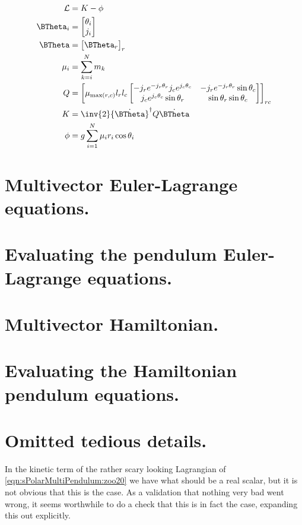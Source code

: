 \begin{align}\label{eqn:sPolarMultiPendulum:zoo20}
\LL &= K - \phi \\
\BTheta_i &=
\begin{bmatrix}
\theta_i \\
j_i
\end{bmatrix} \\
\BTheta &=
{\begin{bmatrix}
\BTheta_r
\end{bmatrix}}_{r} \\
\mu_i &=
\sum_{k=i}^N m_k \\
Q &=
{\begin{bmatrix}
\mu_{\max(r,c)}
l_r l_c
\begin{bmatrix}
- j_r e^{-j_r \theta_r} j_c e^{j_c\theta_c} & - j_r e^{-j_r \theta_r} \sin\theta_c \\
j_c e^{j_c \theta_c} \sin\theta_r & \sin\theta_r \sin\theta_c
\end{bmatrix}
\end{bmatrix}}_{rc} \\
K &=
\inv{2} {\dot{\BTheta}}^\dagger Q \dot{\BTheta} \\
\phi &=
g \sum_{i=1}^N \mu_i r_i \cos\theta_i
\end{align}

\section{Multivector Euler-Lagrange equations.}

\section{Evaluating the pendulum Euler-Lagrange equations.}

\section{Multivector Hamiltonian.}

\section{Evaluating the Hamiltonian pendulum equations.}

\section{Omitted tedious details.}

In the kinetic term of the rather scary looking Lagrangian of \ref{eqn:sPolarMultiPendulum:zoo20} we have what should be a real scalar, but it is not obvious that this is the case.  As a validation that nothing very bad went wrong, it seems worthwhile to do a check that this is in fact the case, expanding this out explicitly.

\EndNoBibArticle
